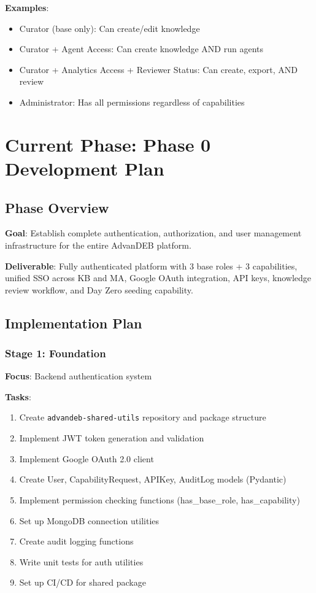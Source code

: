 \documentclass[12pt,a4paper]{article}
\begin{document}
\textbf{Examples}:
\begin{itemize}
    \item Curator (base only): Can create/edit knowledge
    \item Curator + Agent Access: Can create knowledge AND run agents
    \item Curator + Analytics Access + Reviewer Status: Can create, export, AND review
    \item Administrator: Has all permissions regardless of capabilities
\end{itemize}

\section{Current Phase: Phase 0 Development Plan}

\subsection{Phase Overview}

\textbf{Goal}: Establish complete authentication, authorization, and user management infrastructure for the entire AdvanDEB platform.

\textbf{Deliverable}: Fully authenticated platform with 3 base roles + 3 capabilities, unified SSO across KB and MA, Google OAuth integration, API keys, knowledge review workflow, and Day Zero seeding capability.

\subsection{Implementation Plan}

\subsubsection{Stage 1: Foundation}
\textbf{Focus}: Backend authentication system

\textbf{Tasks}:
\begin{enumerate}
    \item Create \texttt{advandeb-shared-utils} repository and package structure
    \item Implement JWT token generation and validation
    \item Implement Google OAuth 2.0 client
    \item Create User, CapabilityRequest, APIKey, AuditLog models (Pydantic)
    \item Implement permission checking functions (has\_base\_role, has\_capability)
    \item Set up MongoDB connection utilities
    \item Create audit logging functions
    \item Write unit tests for auth utilities
    \item Set up CI/CD for shared package
\end{enumerate}
\end{document}
